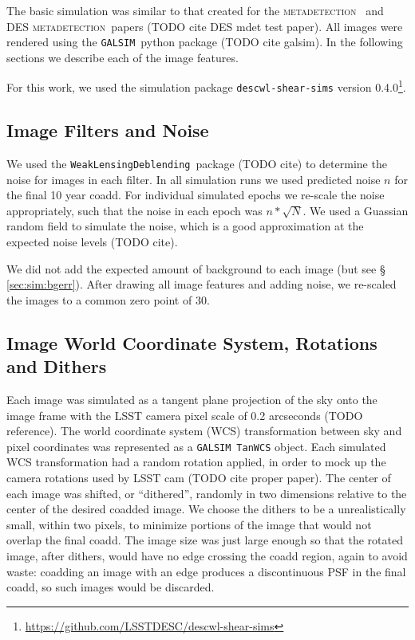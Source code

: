 \documentclass[iop, twocolappendix, appendixfloats, numberedappendix, apj]{hackemulateapj}
\newcommand{\descwl}{\texttt{WeakLensingDeblending}}
\newcommand{\galsim}{\texttt{GALSIM}}
\newcommand{\mdet}{\textsc{metadetection}}
\begin{document}
The basic simulation was similar to that created for the \mdet\ \citep{mdet20} and
DES \mdet\ papers (TODO cite DES mdet test paper).  All images were rendered
using the \galsim\ python package (TODO cite galsim).  In the following
sections we describe each of the image features.

For this work, we used the simulation package \texttt{descwl-shear-sims}
version 0.4.0\footnote{\url{https://github.com/LSSTDESC/descwl-shear-sims}}.

\subsection{Image Filters and Noise} \label{sec:sim:noise}

We used the \descwl\ package (TODO cite) to determine the
noise for images in each filter.  In all simulation runs we used predicted
noise $n$ for the final 10 year coadd.  For individual simulated epochs we
re-scale the noise appropriately, such that the noise in each epoch was $n *
\sqrt{N}$.  We used a Guassian random field to simulate the noise, which is a
good approximation at the expected noise levels (TODO cite).

We did not add the expected amount of background to each image (but see \S
\ref{sec:sim:bgerr}).  After drawing all image features and adding
noise, we re-scaled the images to a common zero point of 30.

\subsection{Image World Coordinate System, Rotations and Dithers} \label{sec:sim:rotdith}

Each image was simulated as a tangent plane projection of the sky onto the
image frame with the LSST camera pixel scale of 0.2 arcseconds (TODO reference).
The world coordinate system (WCS) transformation between sky and pixel
coordinates was represented as a \galsim\ \texttt{TanWCS} object.  Each
simulated WCS transformation had a random rotation applied, in order to mock up
the camera rotations used by LSST cam (TODO cite proper paper).  The center of
each image was shifted, or ``dithered'', randomly in two dimensions relative to
the center of the desired coadded image.  We choose the dithers to be a
unrealistically small, within two pixels, to minimize portions of the image
that would not overlap the final coadd.  The image size was just large enough
so that the rotated image, after dithers, would have no edge crossing the coadd
region, again to avoid waste:  coadding an image with an edge produces a
discontinuous PSF in the final coadd, so such images would be discarded.
\end{document}
